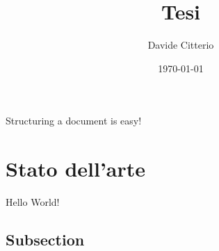 \documentclass{article}
\title{Tesi}
\date{\today}
\author{Davide Citterio}
\begin{document}
\maketitle
{}

\newpage
{}


Structuring a document is easy!

\newpage
{}

\section{Stato dell'arte}

Hello World!

\subsection{Subsection}
\end{document}
